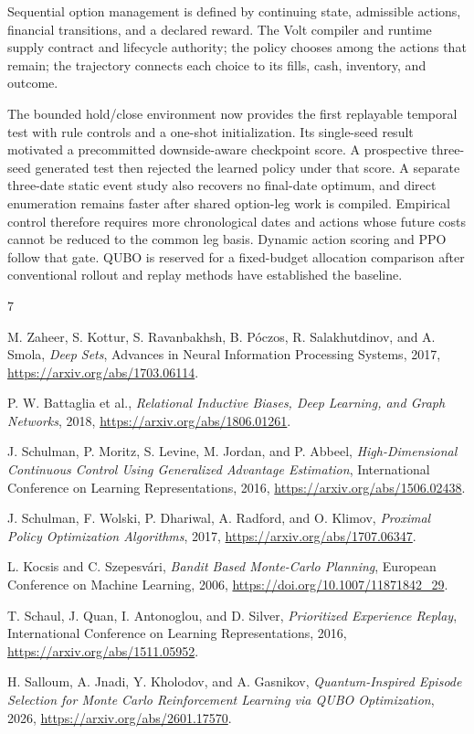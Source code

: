 \documentclass{strategynet-journal}
\newcommand{\VOLT}{\textsf{Volt}}
\begin{document}
Sequential option management is defined by continuing state, admissible
actions, financial transitions, and a declared reward.  The \VOLT{} compiler
and runtime supply contract and lifecycle authority; the policy chooses among
the actions that remain; the trajectory connects each choice to its fills,
cash, inventory, and outcome.

The bounded hold/close environment now provides the first replayable temporal
test with rule controls and a one-shot initialization.  Its single-seed result
motivated a precommitted downside-aware checkpoint score.  A prospective
three-seed generated test then rejected the learned policy under that score.
A separate three-date static event study also recovers no final-date optimum,
and direct enumeration remains faster after shared option-leg work is
compiled.  Empirical control therefore requires more chronological dates and
actions whose future costs cannot be reduced to the common leg basis.
Dynamic action scoring and PPO follow that gate.  QUBO is reserved for a
fixed-budget allocation comparison after conventional rollout and replay
methods have established the baseline.

\begin{thebibliography}{7}

M. Zaheer, S. Kottur, S. Ravanbakhsh, B. Póczos, R. Salakhutdinov, and
A. Smola,
\emph{Deep Sets},
Advances in Neural Information Processing Systems, 2017,
\url{https://arxiv.org/abs/1703.06114}.

P. W. Battaglia et al.,
\emph{Relational Inductive Biases, Deep Learning, and Graph Networks},
2018,
\url{https://arxiv.org/abs/1806.01261}.

J. Schulman, P. Moritz, S. Levine, M. Jordan, and P. Abbeel,
\emph{High-Dimensional Continuous Control Using Generalized Advantage
Estimation},
International Conference on Learning Representations, 2016,
\url{https://arxiv.org/abs/1506.02438}.

J. Schulman, F. Wolski, P. Dhariwal, A. Radford, and O. Klimov,
\emph{Proximal Policy Optimization Algorithms},
2017,
\url{https://arxiv.org/abs/1707.06347}.

L. Kocsis and C. Szepesv\'ari,
\emph{Bandit Based Monte-Carlo Planning},
European Conference on Machine Learning, 2006,
\url{https://doi.org/10.1007/11871842_29}.

T. Schaul, J. Quan, I. Antonoglou, and D. Silver,
\emph{Prioritized Experience Replay},
International Conference on Learning Representations, 2016,
\url{https://arxiv.org/abs/1511.05952}.

H. Salloum, A. Jnadi, Y. Kholodov, and A. Gasnikov,
\emph{Quantum-Inspired Episode Selection for Monte Carlo Reinforcement
Learning via QUBO Optimization},
2026,
\url{https://arxiv.org/abs/2601.17570}.

\end{thebibliography}
\end{document}
